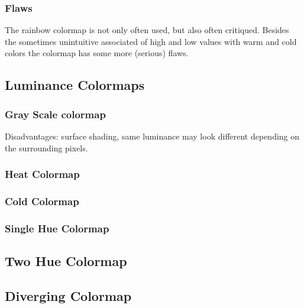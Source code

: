 \subsubsection{Flaws} %
\label{ssub:flaws}
The rainbow colormap is not only often used, but also often critiqued\cite{borland2007rainbow}\cite{divergingMoreland2009}. Besides the sometimes unintuitive associated of high and low values with warm and cold colors the colormap has some more (serious) flaws. 




\subsection{Luminance Colormaps} %
\label{sub:luminance_colormaps}


\subsubsection{Gray Scale colormap} %
\label{ssub:gray_scale_colormap}

Disadvantages: surface shading, same luminance may look different depending on the surrounding pixels.

\subsubsection{Heat Colormap} %
\label{sub:heat__colormap}

\subsubsection{Cold Colormap} %
\label{ssub:cold_colormap}

\subsubsection{Single Hue Colormap} %
\label{ssub:single_hue_colormap}

\subsection{Two Hue Colormap} %
\label{sub:two_hue_colormap}


\subsection{Diverging Colormap} %
\label{sub:diverging_colormap}


